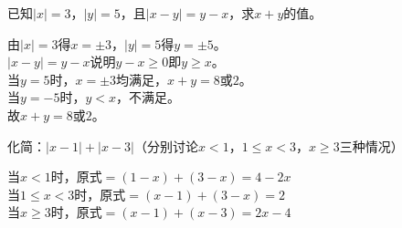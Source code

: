 \documentclass[a4paper,12pt]{ctexart}
\begin{document}

\begin{example}
已知$|x|=3$，$|y|=5$，且$|x-y|=y-x$，求$x+y$的值。
\end{example}
\begin{solution}
由$|x|=3$得$x=\pm3$，$|y|=5$得$y=\pm5$。\\
$|x-y|=y-x$说明$y-x\ge0$即$y\ge x$。\\
当$y=5$时，$x=\pm3$均满足，$x+y=8$或$2$。\\
当$y=-5$时，$y< x$，不满足。\\
故$x+y=8$或$2$。
\end{solution}

\begin{example}
化简：$|x-1|+|x-3|$（分别讨论$x<1$，$1\le x<3$，$x\ge3$三种情况）
\end{example}
\begin{solution}
当$x<1$时，原式$=(1-x)+(3-x)=4-2x$\\
当$1\le x<3$时，原式$=(x-1)+(3-x)=2$\\
当$x\ge3$时，原式$=(x-1)+(x-3)=2x-4$
\end{solution}

\end{document}
